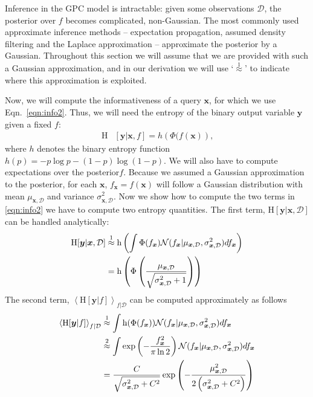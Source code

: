\documentclass[twoside]{article}
\newcommand{\bx}{\bm{x}}
\newcommand{\x}{\bm{x}}
\newcommand{\y}{\bm{y}}
\newcommand{\data}{\mathcal{D}}
\newcommand{\Hu}{\mathrm{H}}
\begin{document}
Inference in the GPC model is intractable: given some observations $\data$, the posterior over $f$ becomes complicated, non-Gaussian. The most commonly used approximate inference methods -- expectation propagation, assumed density filtering and the Laplace approximation -- approximate the posterior by a Gaussian. Throughout this section we will assume that we are provided with such a Gaussian approximation, and in our derivation we will use `$\stackrel{1}{\approx}$' to indicate where this approximation is exploited.

Now, we will compute the informativeness of a query $\x$, for which we use Eqn.\  \eqref{eqn:info2}. Thus, we will need the entropy of the binary output variable $\y$ given a fixed $f$:
\begin{align}
	\Hu&[\y\vert\x,f] = h\left(\Phi(f(\x)\right)\mbox{,}
\end{align}
where $h$ denotes the binary entropy function $h(p)=- p\log p - (1-p)\log(1-p)$.  We will also have to compute expectations over the posterior$f$. Because we assumed a Gaussian approximation to the posterior, for each $\x$, $f_{\x} = f(\x)$ will follow a Gaussian distribution with mean $\mu_{\x,\data}$ and variance $\sigma_{\x,\data}^2$. Now we show how to compute the two terms in \eqref{eqn:info2} we have to compute two entropy quantities. The first term, $\mathrm{H}[\y\vert\x,\data]$ can be handled analytically:
\begin{align}
	\Hu[\y\vert\bx,\data] &\stackrel{1}{\approx} \mathrm{h} \left( \int \Phi( f_{\x} )  \mathcal{N}(f_{\x}\vert \mu_{\x,\data},\sigma_{\x,\data}^2) df_{\x} \right)  \notag\\
	&= \mathrm{h} \left( \Phi\left( \frac{\mu_{\x,\data}}{\sqrt{\sigma^2_{\x,\data} + 1}} \right)\right)\label{ent_mean}
\end{align}
The second term, $\left\langle\Hu[\y\vert f]\right\rangle_{f\vert\data}$ can be computed approximately as follows
\begin{align}
	\left\langle\Hu[\y\vert f]\right\rangle_{f\vert\data} &\stackrel{1}{\approx}\int \mathrm{h}(\Phi(f_{\x})) \mathcal{N}(f_{\x}\vert \mu_{\x,\data},\sigma_{\x,\data}^2)df_{\x}\notag\\
	&\stackrel{2}{\approx} \int \exp\left(-\frac{f_{\x}^2}{\pi\ln2}\right) \mathcal{N}(f_{\x}\vert \mu_{\x,\data},\sigma_{\x,\data}^2)df_{\x}\notag\\	
	&= \frac{C}{\sqrt{\sigma_{\x,\data}^2 + C^2}}\exp\left(-\frac{\mu_{\x,\data}^2}{2\left(\sigma_{\x,\data}^2 + C^2\right)}\right)\label{eqn:mean_entropy}
\end{align}
\end{document}
